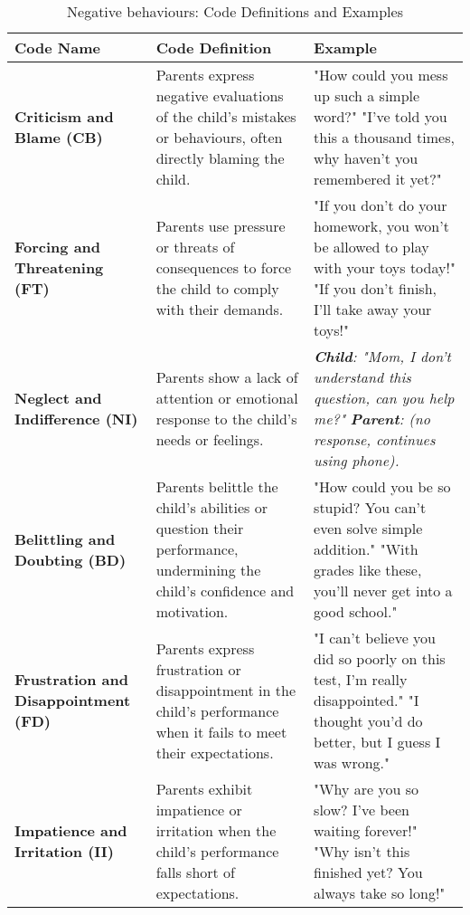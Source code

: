 \begin{table}[h]
\centering
\footnotesize
\caption{Negative behaviours: Code Definitions and Examples}
\begin{tabular}{p{} p{} p{}}
\hline
\textbf{Code Name} & \textbf{Code Definition} & \textbf{Example} \\ \hline
\textbf{Criticism and Blame (CB)} & Parents express negative evaluations of the child's mistakes or behaviours, often directly blaming the child. & "How could you mess up such a simple word?" \newline "I've told you this a thousand times, why haven't you remembered it yet?" \\ \hline
\textbf{Forcing and Threatening (FT)} & Parents use pressure or threats of consequences to force the child to comply with their demands. & "If you don't do your homework, you won't be allowed to play with your toys today!" \newline "If you don't finish, I'll take away your toys!" \\ \hline
\textbf{Neglect and Indifference (NI)} & Parents show a lack of attention or emotional response to the child's needs or feelings. & \textit{\textbf{Child}: "Mom, I don't understand this question, can you help me?"} \newline \textit{\textbf{Parent}: (no response, continues using phone).} \\ \hline
\textbf{Belittling and Doubting (BD)} & Parents belittle the child's abilities or question their performance, undermining the child's confidence and motivation. & "How could you be so stupid? You can't even solve simple addition." \newline "With grades like these, you'll never get into a good school." \\ \hline
\textbf{Frustration and Disappointment (FD)} & Parents express frustration or disappointment in the child's performance when it fails to meet their expectations. & "I can't believe you did so poorly on this test, I'm really disappointed." \newline "I thought you'd do better, but I guess I was wrong." \\ \hline
\textbf{Impatience and Irritation (II)} & Parents exhibit impatience or irritation when the child's performance falls short of expectations. & "Why are you so slow? I've been waiting forever!" \newline "Why isn't this finished yet? You always take so long!" \\ \hline
\end{tabular}
\end{table}
\fi


